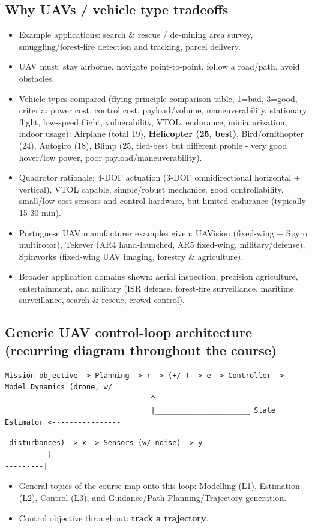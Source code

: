 \documentclass[11pt]{article}
\begin{document}
\subsection{Why UAVs / vehicle type tradeoffs}
\begin{itemize}
\item Example applications: search \& rescue / de-mining area survey, smuggling/forest-fire detection and tracking, parcel delivery.
\item UAV must: stay airborne, navigate point-to-point, follow a road/path, avoid obstacles.
\item Vehicle types compared (flying-principle comparison table, 1=bad, 3=good, criteria: power cost, control cost, payload/volume, maneuverability, stationary flight, low-speed flight, vulnerability, VTOL, endurance, miniaturization, indoor usage): Airplane (total 19), \textbf{Helicopter (25, best)}, Bird/ornithopter (24), Autogiro (18), Blimp (25, tied-best but different profile - very good hover/low power, poor payload/maneuverability).
\item Quadrotor rationale: 4-DOF actuation (3-DOF omnidirectional horizontal + vertical), VTOL capable, simple/robust mechanics, good controllability, small/low-cost sensors and control hardware, but limited endurance (typically 15-30 min).
\item Portuguese UAV manufacturer examples given: UAVision (fixed-wing + Spyro multirotor), Tekever (AR4 hand-launched, AR5 fixed-wing, military/defense), Spinworks (fixed-wing UAV imaging, forestry \& agriculture).
\item Broader application domains shown: aerial inspection, precision agriculture, entertainment, and military (ISR defense, forest-fire surveillance, maritime surveillance, search \& rescue, crowd control).
\end{itemize}

\subsection{Generic UAV control-loop architecture (recurring diagram throughout the course)}
\scriptsize
\begin{verbatim}
Mission objective -> Planning -> r -> (+/-) -> e -> Controller -> Model Dynamics (drone, w/
                                  ^                                                        
                                  |______________________ State Estimator <----------------
\end{verbatim}
\begin{verbatim}
 disturbances) -> x -> Sensors (w/ noise) -> y
          |
---------|
\end{verbatim}
\normalsize
\begin{itemize}
\item General topics of the course map onto this loop: Modelling (L1), Estimation (L2), Control (L3), and Guidance/Path Planning/Trajectory generation.
\item Control objective throughout: \textbf{track a trajectory}.
\end{itemize}
\end{document}

